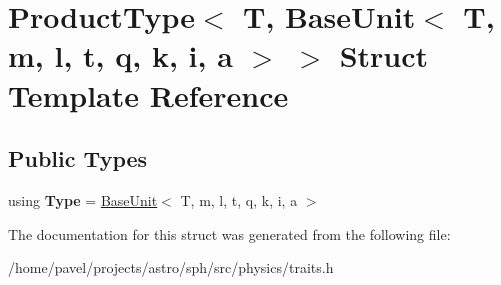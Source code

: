 \hypertarget{structProductType_3_01T_00_01BaseUnit_3_01T_00_01m_00_01l_00_01t_00_01q_00_01k_00_01i_00_01a_01_4_01_4}{}\section{Product\+Type$<$ T, Base\+Unit$<$ T, m, l, t, q, k, i, a $>$ $>$ Struct Template Reference}
\label{structProductType_3_01T_00_01BaseUnit_3_01T_00_01m_00_01l_00_01t_00_01q_00_01k_00_01i_00_01a_01_4_01_4}
\subsection*{Public Types}
\begin{DoxyCompactItemize}
\item 
\hypertarget{structProductType_3_01T_00_01BaseUnit_3_01T_00_01m_00_01l_00_01t_00_01q_00_01k_00_01i_00_01a_01_4_01_4_ad8dcc49b8618861e0c745763d9ada0db}{}\label{structProductType_3_01T_00_01BaseUnit_3_01T_00_01m_00_01l_00_01t_00_01q_00_01k_00_01i_00_01a_01_4_01_4_ad8dcc49b8618861e0c745763d9ada0db} 
using {\bfseries Type} = \hyperlink{classBaseUnit}{Base\+Unit}$<$ T, m, l, t, q, k, i, a $>$
\end{DoxyCompactItemize}


The documentation for this struct was generated from the following file\+:\begin{DoxyCompactItemize}
\item 
/home/pavel/projects/astro/sph/src/physics/traits.\+h\end{DoxyCompactItemize}

